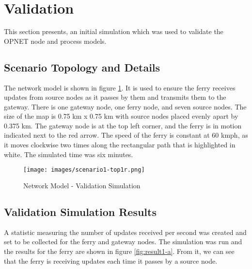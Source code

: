 \section{Validation} 
\label{sec:validation}

This section presents, an initial simulation which was used to validate the OPNET node and process models. 


\subsection{Scenario Topology and Details}
\label{sec:scenario1}

The network model is shown in figure \ref{fig:scenario1}.
It is used to ensure the ferry receives updates from source nodes as it passes by them and transmits them to the gateway. 
There is one gateway node, one ferry node, and seven source nodes. 
The size of the map is 0.75 km x 0.75 km with source nodes placed evenly apart by 0.375 km. 
The gateway node is at the top left corner, and the ferry is in motion indicated next to the red arrow.
The speed of the ferry is constant at 60 kmph, as it moves clockwise two times along the rectangular path that is highlighted in white.  
The simulated time was six minutes.

\begin{figure}[ht]
    \centering
    \texttt{[image: images/scenario1-top1r.png]}
    \caption{Network Model - Validation Simulation}
    \label{fig:scenario1}
\end{figure}

\subsection{Validation Simulation Results}
\label{sec:results-validate}

A statistic measuring the number of updates received per second was created and set to be collected for the ferry and gateway nodes.
The simulation was run and the results for the ferry are shown in figure \ref{fig:result1-a}.  
From it, we can see that the ferry is receiving updates each time it passes by a source node. 

